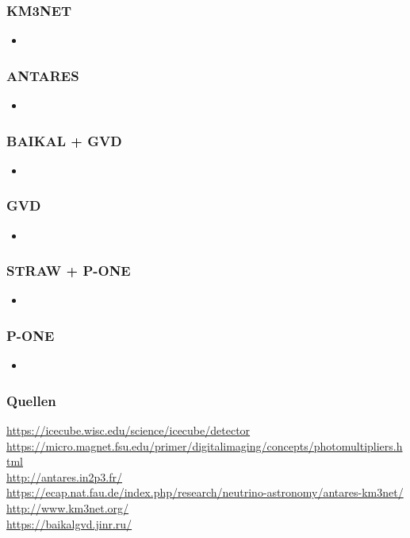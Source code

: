 \documentclass[aspectratio=1610, 9pt]{beamer}
\begin{document}
\begin{frame}\frametitle{KM3NET}
  \begin{itemize}
    \item 
  \end{itemize}
\end{frame}

\begin{frame}\frametitle{ANTARES}
  \begin{itemize}
    \item 
  \end{itemize}
\end{frame}

\begin{frame}\frametitle{BAIKAL + GVD}
  \begin{itemize}
    \item 
  \end{itemize}
\end{frame}

\begin{frame}\frametitle{GVD}
  \begin{itemize}
    \item 
  \end{itemize}
\end{frame}

\begin{frame}\frametitle{STRAW + P-ONE}
  \begin{itemize}
    \item 
  \end{itemize}
\end{frame}

\begin{frame}\frametitle{P-ONE}
  \begin{itemize}
    \item 
  \end{itemize}
\end{frame}

\begin{frame}\frametitle{Quellen}
\url{https://icecube.wisc.edu/science/icecube/detector} \\
\url{https://micro.magnet.fsu.edu/primer/digitalimaging/concepts/photomultipliers.html} \\
\url{http://antares.in2p3.fr/} \\
\url{https://ecap.nat.fau.de/index.php/research/neutrino-astronomy/antares-km3net/} \\
\url{http://www.km3net.org/} \\
\url{https://baikalgvd.jinr.ru/} \\
\end{frame}
\end{document}
